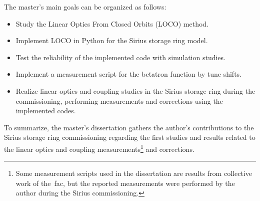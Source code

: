 The master's main goals can be organized as follows:
\begin{itemize}
    \item Study the Linear Optics From Closed Orbits (LOCO) method.
    \item Implement LOCO in Python for the Sirius storage ring model.
    \item Test the reliability of the implemented code with simulation studies.
    \item Implement a measurement script for the betatron function by tune shifts.
    \item Realize linear optics and coupling studies in the Sirius storage ring during the commissioning, performing measurements and corrections using the implemented codes.
\end{itemize}

To summarize, the master's dissertation gathers the author's contributions to the Sirius storage ring commissioning regarding the first studies and results related to the linear optics and coupling measurements\footnote{Some measurement scripts used in the dissertation are results from collective work of the~\gls{fac}, but the reported measurements were performed by the author during the Sirius commissioning.} and corrections. 










